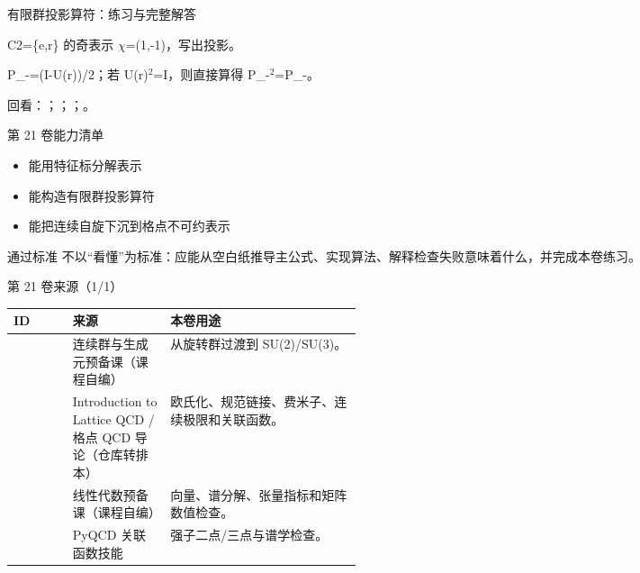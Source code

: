 \begin{frame}[t]{有限群投影算符：练习与完整解答}
\footnotesize
\begin{block}{}C2=\{e,r\} 的奇表示 \ensuremath{\chi}=(1,-1)，写出投影。\end{block}
\begin{exampleblock}{}P\_-=(I-U(r))/\allowbreak{}2；若 U(r)\ensuremath{^{2}}=I，则直接算得 P\_-\ensuremath{^{2}}=P\_-。\end{exampleblock}
\vfill
\scriptsize 回看：；；；。
\end{frame}

\begin{frame}[t]{第 21 卷能力清单}
\small\begin{itemize}
\item[\CheckMark] 能用特征标分解表示
\item[\CheckMark] 能构造有限群投影算符
\item[\CheckMark] 能把连续自旋下沉到格点不可约表示
\end{itemize}\vfill\begin{block}{通过标准}
不以“看懂”为标准：应能从空白纸推导主公式、实现算法、解释检查失败意味着什么，并完成本卷练习。
\end{block}\end{frame}

\begin{frame}[t]{第 21 卷来源（1/1）}
\scriptsize\begin{tabularx}{\linewidth}{p{0.17\linewidth}p{0.28\linewidth}Y}
\toprule ID & 来源 & 本卷用途\\\midrule
{} & 连续群与生成元预备课（课程自编） & 从旋转群过渡到 SU(2)/\allowbreak{}SU(3)。\\
 & Introduction to Lattice QCD /\allowbreak{} 格点 QCD 导论（仓库转排本） & 欧氏化、规范链接、费米子、连续极限和关联函数。\\
 & 线性代数预备课（课程自编） & 向量、谱分解、张量指标和矩阵数值检查。\\
 & PyQCD 关联函数技能 & 强子二点/\allowbreak{}三点与谱学检查。\\
\bottomrule\end{tabularx}\end{frame}

